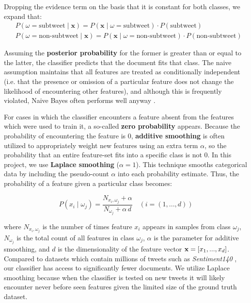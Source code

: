 \documentclass[11pt, twoside, reqno]{book}
\begin{document}
\noindent 
Dropping the evidence term on the basis that it is constant for both classes, we expand that:
\[
\begin{split} 
	&  P(\omega = \text{subtweet} \mid \textbf{x}) = P(\textbf{x} \mid \omega = \text{subtweet}) \cdot P(\text{subtweet}) \\
	&  P(\omega = \text{non-subtweet} \mid \textbf{x}) = P(\textbf{x} \mid \omega = \text{non-subtweet}) \cdot P(\text{non-subtweet})
\end{split} 
\]

\noindent
Assuming the \textbf{posterior probability} for the former is greater than or equal to the latter, the classifier predicts that the document fits that class. The naive assumption maintains that all features are treated as conditionally independent (i.e. that the presence or omission of a particular feature does not change the likelihood of encountering other features), and although this is frequently violated, Naive Bayes often performs well anyway \cite{naive_bayes_optimality}. 

For cases in which the classifier encounters a feature absent from the features which were used to train it, a so-called \textbf{zero probability} appears. Because the probability of encountering the feature is 0, \textbf{additive smoothing} is often utilized to appropriately weight new features using an extra term $\alpha$, so the probability that an entire feature-set fits into a specific class is not 0. In this project, we use \textbf{Laplace smoothing} ($\alpha=1$). This technique smooths categorical data by including the pseudo-count $\alpha$ into each probability estimate. Thus, the probability of a feature given a particular class becomes:

\[P(x_i \mid \omega_j) = \frac{N_{x_i, \omega_j}+\alpha}{N_{\omega_j} + \alpha \, d}  \quad (i = (1, ... , d))\]

\noindent 
where $N_{x_i, \omega_j}$ is the number of times feature $x_i$ appears in samples from class $\omega_j$, $N_{\omega_j}$ is the total count of all features in class $\omega_j$, $\alpha$ is the parameter for additive smoothing, and $d$ is the dimensionality of the feature vector $\textbf x = [x_1, ..., x_d]$. Compared to datasets which contain millions of tweets such as \textit{Sentiment140} \cite{go_dataset}, our classifier has access to significantly fewer documents. We utilize Laplace smoothing because when the classifier is tested on new tweets it will likely encounter never before seen features given the limited size of the ground truth dataset.
\end{document}
